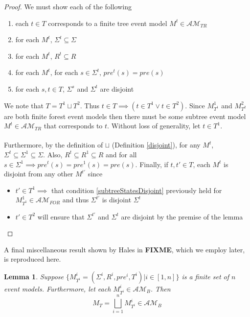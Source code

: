 \documentclass[12pt, a4paper, titlepage]{article}
\newtheorem{lemma}{Lemma}[subsection]
\numberwithin{equation}{section}
\newcommand{\eventClass}{\mathcal{AM}}
\newcommand{\treeClass}{\eventClass_{TR}}
\newcommand{\forestClass}{\eventClass_{FOR}}
\newcommand{\FIXME}{{\bf FIXME}}
\begin{document}
\begin{proof}
We must show each of the following
\begin{enumerate}
	\item each $t \in T$ corresponds to a finite tree event model $M^t \in \treeClass$ \label{treeCorrespondence}
	\item for each $M^t$, $\Sigma^t \subseteq \Sigma$ \label{forestStateSubsets}
	\item for each $M^t$, $R^t \subseteq R$ \label{forestEdgeSubsets}
	\item for each $M^t$, for each $s \in \Sigma^t$, $pre^t(s) = pre(s)$ \label{preconMatch}
	\item for each $s, t \in T$, $\Sigma^s$ and $\Sigma^t$ are disjoint \label{subtreeStatesDisjoint}
\end{enumerate}

We note that $T = T^1 \sqcup T^2$.
Thus $t \in T \implies (t \in T^1 \lor t \in T^2)$.
Since $M^1_{T^1}$ and $M^2_{T^2}$ are both finite forest event models then there must be some
subtree event model $M^t \in \treeClass$ that corresponds to $t$.
Without loss of generality, let $t \in T^1$.\\
\\
Furthermore, by the definition of $\sqcup$ (Definition \ref{disjoint}), for any $M^t$, $\Sigma^t \subseteq \Sigma^1 \subseteq \Sigma$.
Also, $R^t \subseteq R^1 \subseteq R$ and for all $s \in \Sigma^1 \implies pre^t(s) = pre^1(s) =
pre(s)$.
Finally, if $t, t' \in T$, each $M^t$ is disjoint from any other $M^{t'}$ since
\begin{itemize}
	\item $t' \in T^1 \implies$ that condition \ref{subtreeStatesDisjoint} previously held for
	$M^1_{T^1} \in \forestClass$ and thus $\Sigma^{t'}$ is disjoint $\Sigma^t$
	\item $t' \in T^2$ will ensure that $\Sigma^{t'}$ and $\Sigma^t$ are disjoint by the premise of
	the lemma
\end{itemize}
\end{proof}

A final miscellaneous result shown by Hales in \FIXME, which we employ later, is reproduced here.

\begin{lemma} \label{brestrictDisjoint}
Suppose $\{ M^i_{T^i} = (\Sigma^i, R^i, pre^i, T^i) | i \in [1, n] \}$ is a finite set of $n$ event
models.
Furthermore, let each $M^i_{T^i} \in \eventClass_B$.
Then
\[
	M_T = \bigsqcup_{i = 1}^{n} M^i_{T^i} \in \eventClass_B
\]
\end{lemma}
\end{document}
